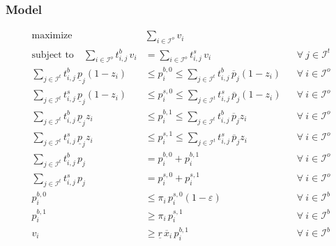 \documentclass[11pt,parskip=full]{scrartcl}%
\newcommand*{\itokens}{\mathcal{I}^t}       %
\newcommand*{\iorders}{\mathcal{I}^o}       %
\newcommand*{\ibuyorders}{\mathcal{I}^b}    %
\begin{document}
\subsubsection*{Model}
\begin{small}
\begin{subequations}
\begin{align}
  \text{maximize} \quad & \sum\limits_{i \in \iorders} v_i
  \label{eq:mip1_objective}
  \\[2mm]
  \text{subject to} \quad
  \sum\limits_{i \in \iorders} t^b_{i,j} \, v_i
  &= \sum\limits_{i \in \iorders} t^s_{i,j} \, v_i
  && \forall \> j \in \itokens
  \label{eq:mip1_tokenbalance}
  \\[2mm]
  \sum\limits_{j \in \itokens} t^b_{i,j} \, \underline{p}_j (1-z_i)
  &\le p_i^{b,0} \le  \sum\limits_{j \in \itokens} t^b_{i,j} \, \overline{p}_j (1-z_i)
  && \forall \> i \in \iorders
  \label{eq:mip1_bounds_buyprice_0}
  \\[1mm]
  \sum\limits_{j \in \itokens} t^s_{i,j} \, \underline{p}_j (1-z_i)
  &\le p_i^{s,0} \le  \sum\limits_{j \in \itokens} t^s_{i,j} \, \overline{p}_j (1-z_i)
  && \forall \> i \in \iorders
  \label{eq:mip1_bounds_sellprice_0}
  \\[1mm]
  \sum\limits_{j \in \itokens} t^b_{i,j} \, \underline{p}_j z_i
  &\le p_i^{b,1} \le  \sum\limits_{j \in \itokens} t^b_{i,j} \, \overline{p}_j z_i
  && \forall \> i \in \iorders
  \label{eq:mip1_bounds_buyprice_1}
  \\[1mm]
  \sum\limits_{j \in \itokens} t^s_{i,j} \, \underline{p}_j z_i
  &\le p_i^{s,1} \le  \sum\limits_{j \in \itokens} t^s_{i,j} \, \overline{p}_j z_i
  && \forall \> i \in \iorders
  \label{eq:mip1_bounds_sellprice_1}
  \\[1mm]
  \sum\limits_{j \in \itokens} t^b_{i,j} \, p_j
  &= p_i^{b,0} + p_i^{b,1}
  && \forall \> i \in \iorders
  \label{eq:mip1_aggr_buyprice}
  \\[1mm]
  \sum\limits_{j \in \itokens} t^s_{i,j} \, p_j
  &= p_i^{s,0} + p_i^{s,1}
  && \forall \> i \in \iorders
  \label{eq:mip1_aggr_sellprice}
  \\[1mm]
  p^{b,0}_i
  &\le \pi_i \, p^{s,0}_i (1-\varepsilon)
  && \forall \> i \in \ibuyorders
  \label{eq:mip1_buyorder_disj_0}
  \\[1mm]
  p^{b,1}_i
  &\ge \pi_i \, p^{s,1}_i
  && \forall \> i \in \ibuyorders
  \label{eq:mip1_buyorder_disj_1}
  \\[1mm]
  v_i
  &\ge \underline{r} \, \overline{x}_i \, p^{b,1}_i
  && \forall \> i \in \ibuyorders
  \label{eq:mip1_buyorder_volume_lb}

\end{align}
\end{subequations}
\end{small}
\end{document}

